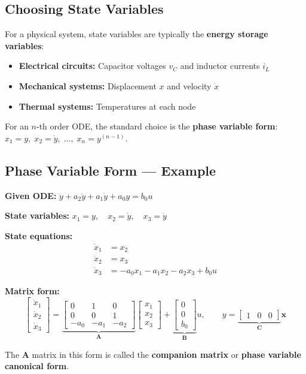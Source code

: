 \documentclass[12pt,a4paper]{article}
\begin{document}
\subsection{Choosing State Variables}

For a physical system, state variables are typically the \textbf{energy storage variables}:
\begin{itemize}[leftmargin=*, itemsep=2pt]
  \item \textbf{Electrical circuits:} Capacitor voltages $v_C$ and inductor currents $i_L$
  \item \textbf{Mechanical systems:} Displacement $x$ and velocity $\dot{x}$
  \item \textbf{Thermal systems:} Temperatures at each node
\end{itemize}

For an $n$-th order ODE, the standard choice is the \textbf{phase variable form}: $x_1 = y,\; x_2 = \dot{y},\; \ldots,\; x_n = y^{(n-1)}$.

\subsection{Phase Variable Form --- Example}

\begin{tcolorbox}[examplebox, title={Example: 3rd Order System}]
\textbf{Given ODE:} $\dddot{y} + a_2\ddot{y} + a_1\dot{y} + a_0 y = b_0 u$

\textbf{State variables:} $x_1 = y,\quad x_2 = \dot{y},\quad x_3 = \ddot{y}$

\textbf{State equations:}
\begin{align*}
\dot{x}_1 &= x_2 \\
\dot{x}_2 &= x_3 \\
\dot{x}_3 &= -a_0 x_1 - a_1 x_2 - a_2 x_3 + b_0 u
\end{align*}

\textbf{Matrix form:}
$$\begin{bmatrix}\dot{x}_1\\\dot{x}_2\\\dot{x}_3\end{bmatrix}
= \underbrace{\begin{bmatrix}0&1&0\\0&0&1\\-a_0&-a_1&-a_2\end{bmatrix}}_{\mathbf{A}}
\begin{bmatrix}x_1\\x_2\\x_3\end{bmatrix}
+ \underbrace{\begin{bmatrix}0\\0\\b_0\end{bmatrix}}_{\mathbf{B}} u, \qquad
y = \underbrace{\begin{bmatrix}1&0&0\end{bmatrix}}_{\mathbf{C}}\mathbf{x}$$

The $\mathbf{A}$ matrix in this form is called the \textbf{companion matrix} or \textbf{phase variable canonical form}.
\end{tcolorbox}
\end{document}
